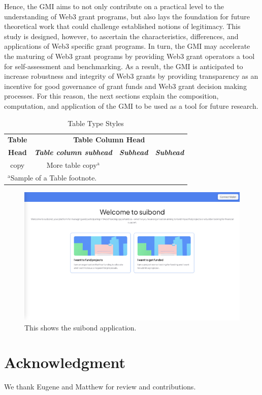 \documentclass[conference]{IEEEtran}
\begin{document}
Hence, the GMI aims to not only contribute on a practical level to the understanding of Web3 grant programs, but also lays the foundation for future theoretical work that could challenge established notions of legitimacy. This study is designed, however, to ascertain the characteristics, differences, and applications of Web3 specific grant programs. In turn, the GMI may accelerate the maturing of Web3 grant programs by providing Web3 grant operators a tool for self-assessment and benchmarking. As a result, the GMI is anticipated to increase robustness and integrity of Web3 grants by providing transparency as an incentive for good governance of grant funds and Web3 grant decision making processes. For this reason, the next sections explain the composition, computation, and application of the GMI to be used as a tool for future research.

\begin{table}[htbp]
\caption{Table Type Styles}
\begin{center}
\begin{tabular}{|c|c|c|c|}
\hline
\textbf{Table}&\multicolumn{3}{|c|}{\textbf{Table Column Head}} \\
\cline{2-4} 
\textbf{Head} & \textbf{\textit{Table column subhead}}& \textbf{\textit{Subhead}}& \textbf{\textit{Subhead}} \\
\hline
copy& More table copy$^{\mathrm{a}}$& &  \\
\hline
\multicolumn{4}{l}{$^{\mathrm{a}}$Sample of a Table footnote.}
\end{tabular}
\label{tab1}
\end{center}
\end{table}

\begin{figure}[htbp]
\centerline{\includegraphics[scale=0.1]{suibond.png}}
\caption{This shows the suibond application.}
\label{fig}
\end{figure}


\section*{Acknowledgment}

We thank Eugene and Matthew for review and contributions.



\end{document}
